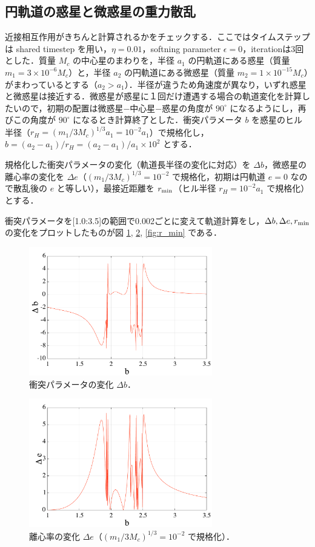 \documentclass[11pt,a4paper,oneside,onecolumn]{jreport}
\begin{document}
\subsection{円軌道の惑星と微惑星の重力散乱}
近接相互作用がきちんと計算されるかをチェックする．ここではタイムステップは shared timestep を用い，$\eta = 0.01$，softning parameter $\epsilon = 0$，iterationは3回とした．質量 $M_c$ の中心星のまわりを，半径 $a_1$ の円軌道にある惑星（質量 $m_1 = 3 \times 10^{-6} M_c$）と，半径 $a_2$ の円軌道にある微惑星（質量 $m_2 = 1 \times 10^{-15} M_c$）がまわっているとする（$a_2 > a_1$）．半径が違うため角速度が異なり，いずれ惑星と微惑星は接近する．微惑星が惑星に１回だけ遭遇する場合の軌道変化を計算したいので，初期の配置は微惑星−中心星−惑星の角度が $90^{\circ}$ になるようにし，再びこの角度が $90^{\circ}$ になるとき計算終了とした．衝突パラメータ $b$ を惑星のヒル半径（$r_H = (m_1 / 3 M_c)^{1/3} a_1 = 10^{-2} a_1$）で規格化し，$b = (a_2 - a_1) / r_H = (a_2 - a_1) / a_1 \times 10^2$ とする．

規格化した衝突パラメータの変化（軌道長半径の変化に対応）を $\Delta b$，微惑星の離心率の変化を $\Delta e$（$(m_1 / 3 M_c)^{1/3} = 10^{-2}$ で規格化，初期は円軌道 $e = 0$ なので散乱後の $e$ と等しい），最接近距離を $r_{\rm min}$（ヒル半径 $r_H = 10^{-2} a_1$ で規格化）とする．

衝突パラメータを[1.0:3.5]の範囲で0.002ごとに変えて軌道計算をし，$\Delta b, \Delta e, r_{\rm min}$ の変化をプロットしたものが図 \ref{fig:delta_b}, \ref{fig:delta_e}, \ref{fig:r_min} である．

\begin{figure}[H]
\centering
\includegraphics[width=8cm]{./image/planetesimal_delta_b.pdf}
\caption{衝突パラメータの変化 $\Delta b$．\label{fig:delta_b}}
\end{figure}

\begin{figure}[H]
\centering
\includegraphics[width=8cm]{./image/planetesimal_delta_e.pdf}
\caption{離心率の変化 $\Delta e$（$(m_1 / 3 M_c)^{1/3} = 10^{-2}$ で規格化）．\label{fig:delta_e}}
\end{figure}
\end{document}
